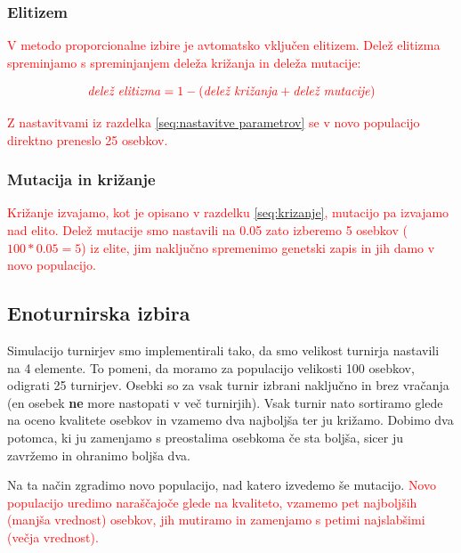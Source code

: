 \documentclass[a4paper, 12pt]{book}
\begin{document}
\newpage
\subsubsection{Elitizem}

\textcolor{red}{V metodo proporcionalne izbire je avtomatsko vklju\v cen elitizem. Dele\v z elitizma spreminjamo s spreminjanjem dele\v za kri\v zanja in dele\v za mutacije:}

\begin{equation}
\label{eq:elitizem}
\textcolor{red}{\textrm{\textit{dele\v z elitizma}} = 1 - (\textrm{\textit{dele\v z kri\v zanja}} + \textrm{\textit{dele\v z mutacije}})}
\end{equation}

\textcolor{red}{Z nastavitvami iz razdelka \ref{seq:nastavitve parametrov} se v novo populacijo direktno preneslo 25 osebkov.}

\subsubsection{Mutacija in kri\v zanje}

\textcolor{red}{Kri\v zanje izvajamo, kot je opisano v razdelku \ref{seq:krizanje}, mutacijo pa izvajamo nad elito. Dele\v z mutacije smo nastavili na 0.05 zato izberemo 5 osebkov ($100*0.05 = 5$) iz elite, jim naklju\v cno spremenimo genetski zapis in jih damo v novo populacijo.}

\subsection{Enoturnirska izbira}

Simulacijo turnirjev smo implementirali tako, da smo velikost turnirja nastavili na 4 elemente. To pomeni, da moramo za populacijo velikosti 100 osebkov, odigrati 25 turnirjev. Osebki so za vsak turnir izbrani naklju\v cno in brez vra\v canja (en osebek \textbf{ne} more nastopati v ve\v c turnirjih). Vsak turnir nato sortiramo glede na oceno kvalitete osebkov in vzamemo dva najbolj\v sa ter ju kri\v zamo. Dobimo dva potomca, ki ju zamenjamo s preostalima osebkoma \v ce sta bolj\v sa, sicer ju zavr\v zemo in ohranimo bolj\v sa dva. 

Na ta na\v cin zgradimo novo populacijo, nad katero izvedemo \v se mutacijo. \textcolor{red}{Novo populacijo uredimo nara\v s\v cajo\v ce glede na kvaliteto, vzamemo pet najbolj\v sih (manj\v sa vrednost) osebkov, jih mutiramo in zamenjamo s petimi najslab\v simi (ve\v cja vrednost).}
\end{document}
